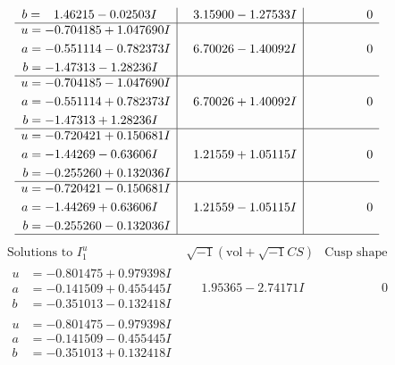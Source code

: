 \documentclass[1p]{elsarticle_modified}
\theoremstyle{definition}
\newcommand{\I}{\sqrt{-1}}
\begin{document}
$$\begin{array}{c|c|c}
\begin{aligned}
b &= \phantom{-}1.46215 - 0.02503 I\end{aligned}
 & \phantom{-}3.15900 - 1.27533 I & \phantom{-0.000000 } 0 \\ \hline\begin{aligned}
u &= -0.704185 + 1.047690 I \\
a &= -0.551114 - 0.782373 I \\
b &= -1.47313 - 1.28236 I\end{aligned}
 & \phantom{-}6.70026 - 1.40092 I & \phantom{-0.000000 } 0 \\ \hline\begin{aligned}
u &= -0.704185 - 1.047690 I \\
a &= -0.551114 + 0.782373 I \\
b &= -1.47313 + 1.28236 I\end{aligned}
 & \phantom{-}6.70026 + 1.40092 I & \phantom{-0.000000 } 0 \\ \hline\begin{aligned}
u &= -0.720421 + 0.150681 I \\
a &= -1.44269 - 0.63606 I \\
b &= -0.255260 + 0.132036 I\end{aligned}
 & \phantom{-}1.21559 + 1.05115 I & \phantom{-0.000000 } 0 \\ \hline\begin{aligned}
u &= -0.720421 - 0.150681 I \\
a &= -1.44269 + 0.63606 I \\
b &= -0.255260 - 0.132036 I\end{aligned}
 & \phantom{-}1.21559 - 1.05115 I & \phantom{-0.000000 } 0\\
 \hline 
 \end{array}$$\newpage$$\begin{array}{c|c|c}  
\text{Solutions to }I^u_{1}& \I (\text{vol} + \sqrt{-1}CS) & \text{Cusp shape}\\
 \hline 
\begin{aligned}
u &= -0.801475 + 0.979398 I \\
a &= -0.141509 + 0.455445 I \\
b &= -0.351013 - 0.132418 I\end{aligned}
 & \phantom{-}1.95365 - 2.74171 I & \phantom{-0.000000 } 0 \\ \hline\begin{aligned}
u &= -0.801475 - 0.979398 I \\
a &= -0.141509 - 0.455445 I \\
b &= -0.351013 + 0.132418 I\end{aligned}

\end{array}$$
\end{document}
